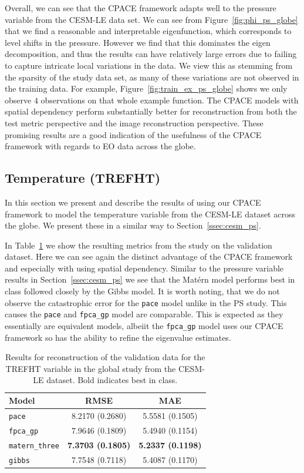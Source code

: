 Overall, we can see that the CPACE framework adapts well to the pressure variable from the CESM-LE data set.
We can see from Figure~\ref{fig:phi_ps_globe} that we find a reasonable and interpretable eigenfunction, which corresponds to level shifts in the pressure.
However we find that this dominates the eigen decomposition, and thus the results can have relatively large errors due to failing to capture intricate local variations in the data.
We view this as stemming from the sparsity of the study data set, as many of these variations are not observed in the training data.
For example, Figure~\ref{fig:train_ex_ps_globe} shows we only observe $4$ observations on that whole example function.
The CPACE models with spatial dependency perform substantially better for reconstruction from both the test metric perspective and the image reconstruction perspective. 
These promising results are a good indication of the usefulness of the CPACE framework with regards to EO data across the globe.

\subsection{Temperature (TREFHT)\label{ssec:cesm_trefht}}
In this section we present and describe the results of using our CPACE framework to model the temperature variable from the CESM-LE dataset across the globe.
We present these in a similar way to Section~\ref{ssec:cesm_ps}.

In Table~\ref{tab:train_cesm_trefht_globe} we show the resulting metrics from the study on the validation dataset.
Here we can see again the distinct advantage of the CPACE framework and especially with using spatial dependency.
Similar to the pressure variable results in Section~\ref{ssec:cesm_ps} we see that the Mat\'ern model performs best in class followed closely by the Gibbs model.
It is worth noting, that we do not observe the catastrophic error for the \verb*|pace| model unlike in the PS study.
This causes the \verb*|pace| and \verb*|fpca_gp| model are comparable.
This is expected as they essentially are equivalent models, albeiit the \verb*|fpca_gp| model uses our CPACE framework so has the ability to refine the eigenvalue estimates.

\begin{table}
	\caption[Results for TREFHT variable on validation data in the Global study]{Results for reconstruction of the validation data for the TREFHT variable in the global study from the CESM-LE dataset. Bold indicates best in class.}
	\centering
	\label{tab:train_cesm_trefht_globe}
	\begin{tabular}{lcc}
		\toprule
		\textbf{Model} & \textbf{RMSE} & \textbf{MAE} \\
		\midrule
		\verb*|pace| & 8.2170	(0.2680) & 5.5581 (0.1505) \\
		\verb*|fpca_gp| & 7.9646	(0.1809) & 5.4940 (0.1154) \\
		\verb*|matern_three| & \textbf{7.3703 (0.1805)}& \textbf{5.2337 (0.1198)}\\
		\verb*|gibbs| & 7.7548 (0.7118) & 5.4087 (0.1170)\\
		\bottomrule
	\end{tabular}
\end{table}

